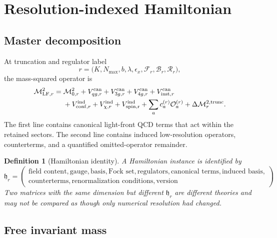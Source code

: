 \documentclass[11pt]{article}
\newtheorem{definition}{Definition}[section]
\newcommand{\LF}{\ensuremath{\mathrm{LF}}}
\newcommand{\cO}{\mathcal O}
\newcommand{\cM}{\mathcal M}
\newcommand{\cR}{\mathcal R}
\newcommand{\cF}{\mathcal F}
\newcommand{\cB}{\mathcal B}
\newcommand{\ind}{\mathrm{ind}}
\newcommand{\trunc}{\mathrm{trunc}}
\newcommand{\conf}{\mathrm{conf}}
\newcommand{\inst}{\mathrm{inst}}
\newcommand{\can}{\mathrm{can}}
\begin{document}
\section{Resolution-indexed Hamiltonian}
\label{sec:hamiltonian}

\subsection{Master decomposition}

At truncation and regulator label
\begin{equation}
 r=\bigl(
 K,N_{\max},b,\lambda,\epsilon_x,\cF_r,
 \cB_r,\cR_r
 \bigr),
 \label{eq:regulator-label}
\end{equation}
the mass-squared operator is
\begin{align}
 \cM_{\LF,r}^{2}
 ={}&\cM_{0,r}^{2}
 +V_{qg,r}^{\can}
 +V_{3g,r}^{\can}
 +V_{4g,r}^{\can}
 +V_{\inst,r}^{\can}
 \nonumber\\
 &+V_{\conf,r}^{\ind}
 +V_{\chi,r}^{\ind}
 +V_{\rm spin,r}^{\ind}
 +\sum_{a}c_{a}^{(r)}\cO_{a}^{(r)}
 +\Delta\cM_{r}^{2,\trunc}.
 \label{eq:master-hamiltonian}
\end{align}
The first line contains canonical light-front QCD terms that act within the
retained sectors.  The second line contains induced low-resolution operators,
counterterms, and a quantified omitted-operator remainder.

\begin{definition}[Hamiltonian identity]
A Hamiltonian instance is identified by
\begin{equation}
 \mathfrak h_r=
 \left(
 \begin{gathered}
 \text{field content},\text{gauge},\text{basis},\text{Fock set},
 \text{regulators},\text{canonical terms},\text{induced basis},\\
 \text{counterterms},\text{renormalization conditions},\text{version}
 \end{gathered}
 \right).
 \label{eq:hamiltonian-identity}
\end{equation}
Two matrices with the same dimension but different \(\mathfrak h_r\) are
different theories and may not be compared as though only numerical resolution
had changed.
\end{definition}

\subsection{Free invariant mass}
\end{document}
